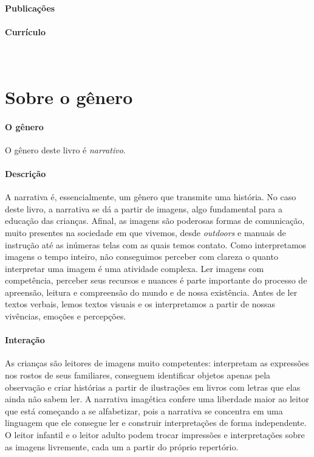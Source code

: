 \documentclass[11pt]{extarticle}
\begin{document}
\paragraph{Publicações} 

\paragraph{Currículo} 
 


\section{Sobre o gênero}

\paragraph{O gênero} O gênero deste livro é \textit{narrativo}. 

\paragraph{Descrição} 
A narrativa é, essencialmente, um gênero que transmite uma história.
No caso deste livro, a narrativa se dá a partir de imagens, algo fundamental para a educação das crianças. Afinal, as imagens são poderosas formas de comunicação, 
muito presentes na sociedade em que vivemos, desde \textit{outdoors} e manuais de 
instrução até as inúmeras telas com as quais temos contato. Como interpretamos 
imagens o tempo inteiro, não conseguimos perceber com clareza o quanto 
interpretar uma imagem é uma atividade complexa. Ler imagens com competência, 
perceber seus recursos e nuances é parte importante do processo de apreensão, 
leitura e compreensão do mundo e de nossa existência. Antes de ler textos 
verbais, lemos textos visuais e os interpretamos a partir de nossas vivências, 
emoções e percepções.

\paragraph{Interação} As crianças são leitores de imagens 
muito competentes: interpretam as expressões nos rostos de seus familiares, 
conseguem identificar objetos apenas pela observação e criar histórias a partir 
de ilustrações em livros com letras que elas ainda não sabem ler. A narrativa imagética 
confere uma liberdade maior ao leitor que está começando a se alfabetizar, pois a narrativa se concentra em uma linguagem que ele consegue ler e construir interpretações de forma 
independente. O leitor infantil e o leitor adulto podem trocar impressões e 
interpretações sobre as imagens livremente, cada um a partir do 
próprio repertório.
\end{document}
